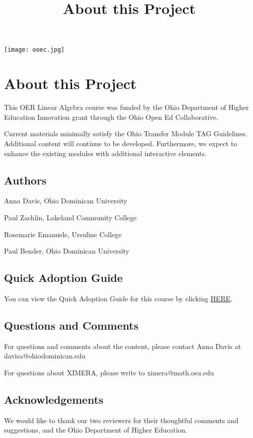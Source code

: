 \documentclass{ximera}
\title{About this Project} \license{CC-BY 4.0}
\begin{document}
\begin{abstract}
\end{abstract}
\maketitle

\begin{image}
\texttt{[image: ooec.jpg]}
\end{image}

\section{About this Project}
This OER Linear Algebra course was funded by the Ohio Department of Higher Education Innovation grant through the Ohio Open Ed Collaborative. 

Current materials minimally satisfy the Ohio Transfer Module TAG Guidelines.  Additional content will continue to be developed.  Furthermore, we expect to enhance the existing modules with additional interactive elements.

\subsection{Authors}
Anna Davis, Ohio Dominican University

Paul Zachlin, Lakeland Community College

Rosemarie Emanuele, Ursuline College

Paul Bender, Ohio Dominican University

\subsection{Quick Adoption Guide}
You can view the Quick Adoption Guide for this course by clicking
\href{https://docs.google.com/document/d/1QdDMhCfn3Q_Cul5uVVYBDCgdzx6ndBxLnyagGVkz9gM/edit?usp=sharing}{HERE}.

\subsection{Questions and Comments}
For questions and comments about the content, please contact Anna Davis at davisa@ohiodominican.edu

For questions about XIMERA, please write to ximera@math.osu.edu

\subsection{Acknowledgements}
We would like to thank our two reviewers for their thoughtful comments and suggestions, and the Ohio Department of Higher Education.
\end{document}
